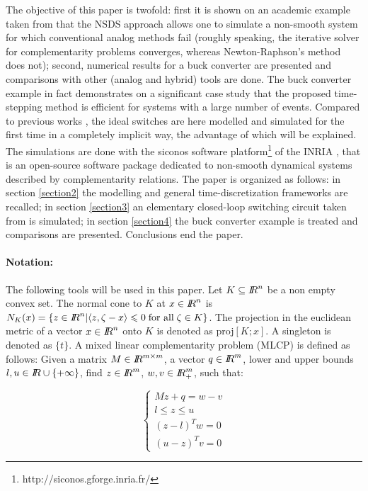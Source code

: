 \documentclass{article}
\def\leq{\leqslant}
\begin{document}
The objective of this paper is twofold: first it is shown on an academic example taken from \cite{maffezzoni2006} that the NSDS approach allows one to simulate a non-smooth system for which conventional analog methods fail (roughly speaking, the iterative solver for complementarity problems converges, whereas Newton-Raphson's method does not); second, numerical results for a buck converter are presented and comparisons with other (analog and hybrid) tools are done. The buck converter example in fact demonstrates on a significant case study that the proposed time-stepping method is efficient for systems with a large number of events. Compared to previous works \cite{glocker2005,vasca2009}, the ideal switches are here modelled and simulated for the first time in a completely implicit way, the advantage of which will be explained.  The simulations are done with the {\sc siconos} software platform\footnote{http://siconos.gforge.inria.fr/} of the INRIA \cite{acary-brogliato2008,Acary-Perignon2007,mathmod}, that is an open-source software package dedicated to non-smooth dynamical systems described by complementarity relations. The paper is organized as follows: in section \ref{section2} the modelling and general time-discretization frameworks are recalled; in section \ref{section3} an elementary closed-loop switching circuit taken from \cite{maffezzoni2006} is simulated; in section \ref{section4} the buck converter example is treated and comparisons are presented. Conclusions end the paper. 


\paragraph{Notation:} The following tools will be used in this paper. Let $K \subseteq \mbox{\rm $I\!\!R$}^{n}$ be a non empty convex set. The normal cone to $K$ at $x \in \mbox{\rm $I\!\!R$}^{n}$ is $N_{K}(x)=\{z \in \RR^{n} | \langle z, \zeta-x \rangle \leq 0\;\mbox{for all}\;\zeta \in K\}$. The projection in the euclidean metric of a vector $x \in \mbox{\rm $I\!\!R$}^{n}$ onto $K$ is denoted as proj$[K;x]$. A singleton is denoted as $\{t\}$. A mixed linear complementarity problem (MLCP) is defined as follows: Given a matrix $M \in \mbox{\rm $I\!\!R$}^{m \times m}$, a vector $q \in \mbox{\rm $I\!\!R$}^{m}$, lower and upper bounds $l, u \in \mbox{\rm $I\!\!R$} \cup \{+\infty\}$, find  $z \in \mbox{\rm $I\!\!R$}^{m}$, $w, v \in \mbox{\rm $I\!\!R$}^{m}_{+}$, such that:


\begin{equation}\label{MLCP}\left\{
\begin{array}{l}  
Mz+q = w-v \\
l \leq z \leq u \\
(z-l)^{T}w=0 \\
(u-z)^{T}v=0
\end{array}\right.
\end{equation}
\end{document}
